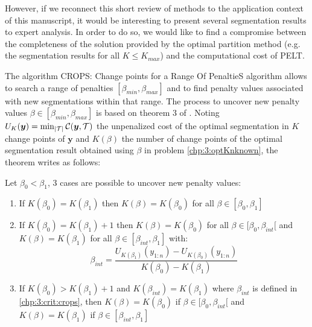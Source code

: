 However, if we reconnect this short review of methods to the application context of this manuscript, it would be interesting to present several segmentation results to expert analysis. In order to do so, we would like to find a compromise between the completeness of the solution provided by the optimal partition method (e.g. the segmentation results for all $K \leq K_{max}$) and the computational cost of PELT. 

The algorithm CROPS: Change points for a Range Of PenaltieS algorithm \citep{haynes2017} allows to search a range of penalties $[\beta_{min},\beta_{max}]$ and to find penalty values associated with new segmentations within that range. The process to uncover new penalty values $\beta \in [\beta_{min},\beta_{max}]$ is based on theorem 3 of \cite{haynes2017}. Noting $U_K(\bm y) = \min_{\lvert{\mathcal T}\rvert} {\mathcal C}(\bm y,{\mathcal T})$ the unpenalized cost of the optimal segmentation in $K$ change points of $\bm y$ and $K(\beta)$ the number of change points of the optimal segmentation result obtained using $\beta$ in problem \ref{chp:3:optKnknown}, the theorem writes as follows:

\begin{theorem}
Let $\beta_0 < \beta_1$, 3 cases are possible to uncover new penalty values:
\begin{enumerate}
  \item If $K(\beta_0) = K(\beta_1)$ then $K(\beta) = K(\beta_0)$ for all $\beta \in [\beta_0,\beta_1]$
  \item If $K(\beta_0) = K(\beta_1)+1$ then $K(\beta) = K(\beta_0)$ for all $\beta\in[\beta_0,\beta_{int}[$ and $K(\beta) = K(\beta_1)$ for all $\beta\in[\beta_{int},\beta_1]$ with:
  \begin{equation}\label{chp:3:crit:crops}
    \beta_{int} = \frac{U_{K(\beta_1)}(y_{1:n})-U_{K(\beta_0)}(y_{1:n})}{K(\beta_0)-K(\beta_1)}
  \end{equation}
  \item If $K(\beta_0) > K(\beta_1)+1$ and $K(\beta_{int}) = K(\beta_1)$ where $\beta_{int}$ is defined in \ref{chp:3:crit:crops}, then $K(\beta) = K(\beta_0)$ if $\beta\in[\beta_0,\beta_{int}[$ and $K(\beta) = K(\beta_1)$ if $\beta\in [\beta_{int},\beta_1]$
\end{enumerate}
\end{theorem} 

